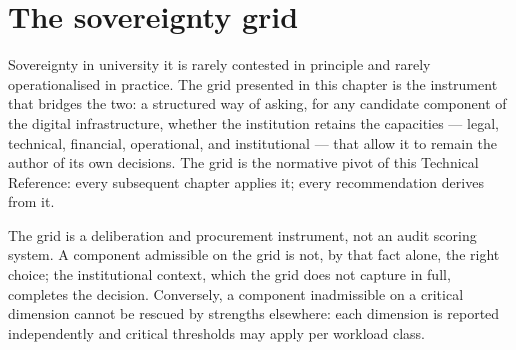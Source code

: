 
\chapter{The sovereignty grid}
\label{ch:sovereignty-grid}

Sovereignty in university \gls{it} is rarely contested in principle and
rarely operationalised in practice. The grid presented in this chapter
is the instrument that bridges the two: a structured way of asking, for
any candidate component of the digital infrastructure, whether the
institution retains the capacities --- legal, technical, financial,
operational, and institutional --- that allow it to remain the author
of its own decisions. The grid is the normative pivot of this Technical
Reference: every subsequent chapter applies it; every recommendation
derives from it.

\begin{caveatbox}
\noindent The grid is a deliberation and procurement instrument, not an
audit scoring system. A component admissible on the grid is not, by
that fact alone, the right choice; the institutional context, which the
grid does not capture in full, completes the decision. Conversely, a
component inadmissible on a critical dimension cannot be rescued by
strengths elsewhere: each dimension is reported independently and
critical thresholds may apply per workload class.
\end{caveatbox}

